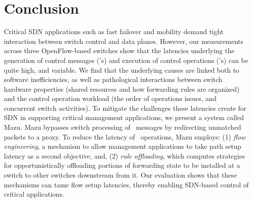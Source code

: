 \section{Conclusion}
\label{sec:conclusion}
Critical SDN applications such as fast failover and mobility demand
tight interaction between switch control and data planes. However, our
measurements across three OpenFlow-based switches show that the
latencies underlying the generation of control messages (\packetin's)
and execution of control operations (\flowmod's) can be quite high, and
variable. We find that the underlying causes are linked both to
software inefficiencies, as well as pathological interactions between
switch hardware properties (shared resources and how forwarding rules
are organized) and the control operation workload (the order of
operations issues, and concurrent switch activities).  To mitigate the
challenges these latencies create for SDN in supporting critical
management applications, we present a system called Mazu. Mazu
bypasses switch processing of \packetin\ messages by redirecting
unmatched packets to a proxy. To reduce the latency of
\flowmod\ operations, Mazu employs: (1) \emph{flow engineering}, a
mechanism to allow management applications to take path setup latency
as a second objective, and, (2) {\em rule offloading}, which computes
strategies for opportunistically offloading portions of forwarding
state to be installed at a switch to other switches downstream from
it. Our evaluation shows that these mechanisms can tame flow setup
latencies, thereby enabling SDN-based control of critical
applications.


